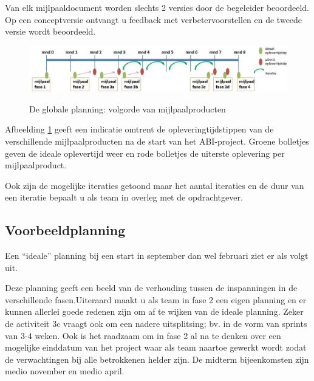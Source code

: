 Van elk mijlpaaldocument worden slechts 2 versies door de begeleider
beoordeeld. Op een conceptversie ontvangt u feedback met
verbetervoorstellen en de tweede versie wordt beoordeeld.

\begin{figure}[!ht]
    \includegraphics[width=\textwidth]{./globale-tijdsplanning.jpg}
    \label{fig:globale-planning}
    \caption{De globale planning: volgorde van mijlpaalproducten}
\end{figure}

Afbeelding \ref{fig:globale-planning} geeft een indicatie omtrent de
opleveringtijdstippen van de verschillende mijlpaalproducten na de
start van het ABI-project. Groene bolletjes geven de ideale
oplevertijd weer en rode bolletjes de uiterste oplevering
per mijlpaalproduct.

Ook zijn de mogelijke iteraties getoond maar het aantal
iteraties en de duur van een iteratie bepaalt u als team
in overleg met de opdrachtgever.

\subsection{Voorbeeldplanning}
Een ``ideale'' planning bij een start in september dan wel februari
ziet er als volgt uit.

Deze planning geeft een beeld van de verhouding tussen de inspanningen
in de verschillende fasen.Uiteraard maakt u als team in fase 2 een eigen
planning en er kunnen allerlei goede redenen zijn om af te wijken van
de ideale planning. Zeker de activiteit 3c vraagt ook om een nadere
uitsplitsing; bv. in de vorm van sprints van 3-4 weken. Ook is het
raadzaam om in fase 2 al na te denken over een mogelijke einddatum
van het project waar als team naartoe gewerkt wordt zodat de verwachtingen
bij alle betrokkenen helder zijn.
De midterm bijeenkomsten zijn medio november en medio april.


